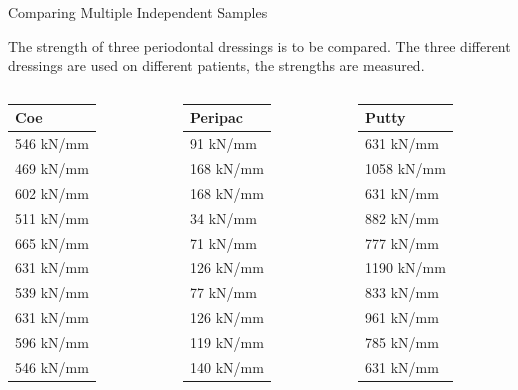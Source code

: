 \begin{frame}{Comparing Multiple Independent Samples}

    The strength of three periodontal dressings is to be compared. The
    three different dressings are used on different patients, the
    strengths are measured. 

  \begin{columns}
    \begin{tabular}{l}
      Coe \\ \hline
      546 kN/mm\\ 469 kN/mm\\ 602 kN/mm\\ 511 kN/mm\\ 665 kN/mm\\ 631
      kN/mm\\ 539 kN/mm\\ 631 kN/mm\\ 596 kN/mm\\ 546 kN/mm
    \end{tabular}
    \begin{tabular}{l}
      Peripac \\ \hline
      91 kN/mm\\ 168 kN/mm\\ 168 kN/mm\\ 34 kN/mm\\ 71 kN/mm\\ 126 kN/mm\\
      77 kN/mm\\ 126 kN/mm\\ 119 kN/mm\\ 140 kN/mm
    \end{tabular}

    \begin{tabular}{l}
      Putty \\ \hline
      631 kN/mm\\ 1058 kN/mm\\ 631 kN/mm\\ 882 kN/mm\\ 777 kN/mm\\
      1190 kN/mm\\ 833 kN/mm\\ 961 kN/mm\\ 785 kN/mm\\ 631 kN/mm
    \end{tabular}

  \end{columns}


\end{frame}


